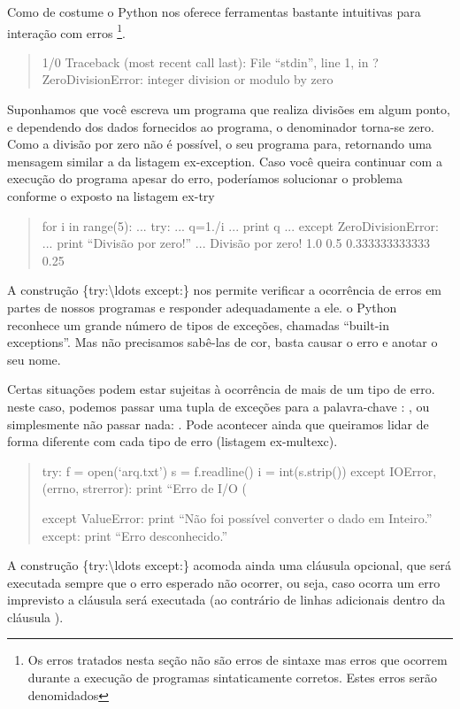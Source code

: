 \documentclass[a4paper,10pt,portuguese]{sphinxmanual}
\begin{document}
Como de costume o Python nos oferece ferramentas bastante
intuitivas para interação com erros \footnote{
Os erros tratados nesta seção não são erros de sintaxe mas erros
que ocorrem durante a execução de programas sintaticamente
corretos. Estes erros serão denomidados 
}.
\begin{quote}

1/0 Traceback (most recent call last): File ``stdin'', line 1, in ?
ZeroDivisionError: integer division or modulo by zero
\end{quote}

Suponhamos que você escreva um programa que realiza divisões em
algum ponto, e dependendo dos dados fornecidos ao programa, o
denominador torna-se zero. Como a divisão por zero não é possível,
o seu programa para, retornando uma mensagem similar a da listagem
ex-exception. Caso você queira continuar com a execução do programa
apesar do erro, poderíamos solucionar o problema conforme o exposto
na listagem ex-try
\begin{quote}

for i in range(5): ... try: ... q=1./i ... print q ... except
ZeroDivisionError: ... print ``Divisão por zero!'' ... Divisão por
zero! 1.0 0.5 0.333333333333 0.25
\end{quote}

A construção \{try:\textbackslash{}ldots except:\} nos permite verificar a
ocorrência de erros em partes de nossos programas e responder
adequadamente a ele. o Python reconhece um grande número de tipos
de exceções, chamadas ``built-in exceptions''. Mas não precisamos
sabê-las de cor, basta causar o erro e anotar o seu nome.

Certas situações podem estar sujeitas à ocorrência de mais de um
tipo de erro. neste caso, podemos passar uma tupla de exceções para
a palavra-chave :
, ou simplesmente
não passar nada: . Pode acontecer ainda que
queiramos lidar de forma diferente com cada tipo de erro (listagem
ex-multexc).
\begin{quote}

try: f = open(`arq.txt') s = f.readline() i = int(s.strip()) except
IOError, (errno, strerror): print ``Erro de I/O (

except ValueError: print ``Não foi possível converter o dado em
Inteiro.'' except: print ``Erro desconhecido.''
\end{quote}

A construção \{try:\textbackslash{}ldots except:\} acomoda ainda uma cláusula
 opcional, que será executada sempre que o erro esperado
não ocorrer, ou seja, caso ocorra um erro imprevisto a cláusula
 será executada (ao contrário de linhas adicionais dentro
da cláusula ).
\end{document}
